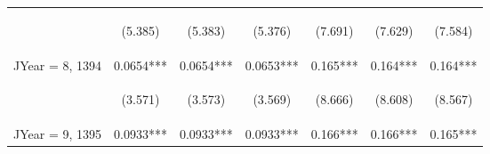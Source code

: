 \documentclass[]{article}
\begin{document}
\begin{center}
\begin{tabular}{lcccccc}
        \vspace{4pt}     & \begin{footnotesize}(5.385)\end{footnotesize}  & \begin{footnotesize}(5.383)\end{footnotesize}  & \begin{footnotesize}(5.376)\end{footnotesize}  & \begin{footnotesize}(7.691)\end{footnotesize}   & \begin{footnotesize}(7.629)\end{footnotesize}  & \begin{footnotesize}(7.584)\end{footnotesize}  \\
        JYear = 8, 1394  & 0.0654***                                      & 0.0654***                                      & 0.0653***                                      & 0.165***                                        & 0.164***                                       & 0.164***                                       \\
        \vspace{4pt}     & \begin{footnotesize}(3.571)\end{footnotesize}  & \begin{footnotesize}(3.573)\end{footnotesize}  & \begin{footnotesize}(3.569)\end{footnotesize}  & \begin{footnotesize}(8.666)\end{footnotesize}   & \begin{footnotesize}(8.608)\end{footnotesize}  & \begin{footnotesize}(8.567)\end{footnotesize}  \\
        JYear = 9, 1395  & 0.0933***                                      & 0.0933***                                      & 0.0933***                                      & 0.166***                                        & 0.166***                                       & 0.165***                                       \\

\end{tabular}
\end{center}
\end{document}
